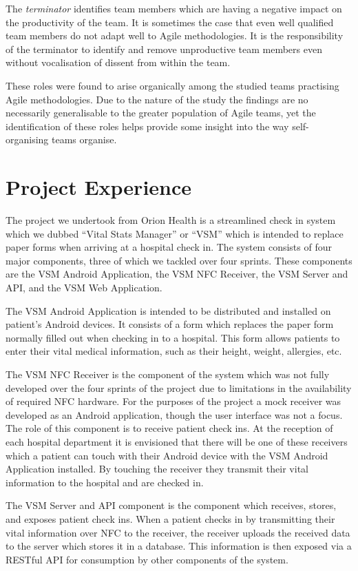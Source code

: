 \documentclass[conference]{IEEEtran}
\begin{document}
The \emph{terminator} identifies team members which are having a negative impact
on the productivity of the team. It is sometimes the case that even well
qualified team members do not adapt well to Agile methodologies. It is the
responsibility of the terminator to identify and remove unproductive team
members even without vocalisation of dissent from within the team.

These roles were found to arise organically among the studied teams practising
Agile methodologies. Due to the nature of the study the findings are no
necessarily generalisable to the greater population of Agile teams, yet the
identification of these roles helps provide some insight into the way self-
organising teams organise.

\section{Project Experience}\label{projexp}

The project we undertook from Orion Health is a streamlined check in system
which we dubbed ``Vital Stats Manager'' or ``VSM'' which is intended to replace
paper forms when arriving at a hospital check in. The system consists of four
major components, three of which we tackled over four sprints. These components
are the VSM Android Application, the VSM NFC Receiver, the VSM Server and API,
and the VSM Web Application.

The VSM Android Application \cite{vsmdrd} is intended to be distributed and
installed on patient's Android devices. It consists of a form which replaces the
paper form normally filled out when checking in to a hospital. This form allows
patients to enter their vital medical information, such as their height, weight,
allergies, etc.

The VSM NFC Receiver \cite{vsmnfc} is the component of the system which was not
fully developed over the four sprints of the project due to limitations in the
availability of required NFC hardware. For the purposes of the project a mock
receiver was developed as an Android application, though the user interface was
not a focus. The role of this component is to receive patient check ins. At the
reception of each hospital department it is envisioned that there will be one of
these receivers which a patient can touch with their Android device with the VSM
Android Application installed. By touching the receiver they transmit their
vital information to the hospital and are checked in.

The VSM Server and API \cite{vsmsvr} component is the component which receives,
stores, and exposes patient check ins. When a patient checks in by transmitting
their vital information over NFC to the receiver, the receiver uploads the
received data to the server which stores it in a database. This information is
then exposed via a RESTful API for consumption by other components of the
system.
\end{document}
